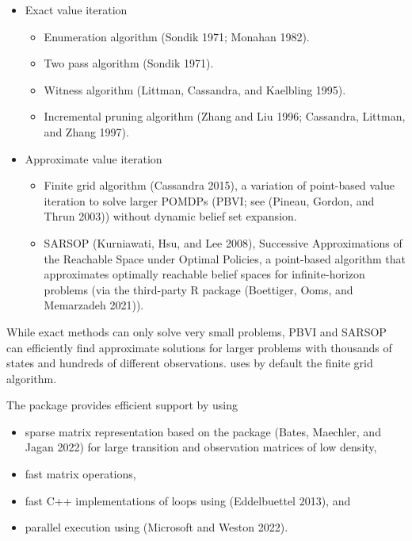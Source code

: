 \begin{itemize}
\tightlist
\item
  Exact value iteration

  \begin{itemize}
  \tightlist
  \item
    Enumeration algorithm (Sondik 1971; Monahan 1982).
  \item
    Two pass algorithm (Sondik 1971).
  \item
    Witness algorithm (Littman, Cassandra, and Kaelbling 1995).
  \item
    Incremental pruning algorithm (Zhang and Liu 1996; Cassandra, Littman, and Zhang 1997).
  \end{itemize}
\item
  Approximate value iteration

  \begin{itemize}
  \tightlist
  \item
    Finite grid algorithm (Cassandra 2015), a variation of point-based value iteration to solve larger POMDPs (PBVI; see (Pineau, Gordon, and Thrun 2003)) without dynamic belief set expansion.
  \item
    SARSOP (Kurniawati, Hsu, and Lee 2008), Successive Approximations of the
    Reachable Space under Optimal Policies, a point-based algorithm
    that approximates optimally reachable belief spaces for
    infinite-horizon problems (via the third-party
    R package  (Boettiger, Ooms, and Memarzadeh 2021)).
  \end{itemize}
\end{itemize}

While exact methods can only solve very small problems, PBVI and
SARSOP can efficiently find approximate solutions for larger
problems with thousands of states and hundreds of different
observations.  uses by default the finite grid
algorithm.

The  package provides efficient support by using

\begin{itemize}
\tightlist
\item
  sparse matrix representation based on the  package (Bates, Maechler, and Jagan 2022) for large transition and observation
  matrices of low density,
\item
  fast matrix operations,
\item
  fast C++ implementations of loops using  (Eddelbuettel 2013), and
\item
  parallel execution using  (Microsoft and Weston 2022).
\end{itemize}

